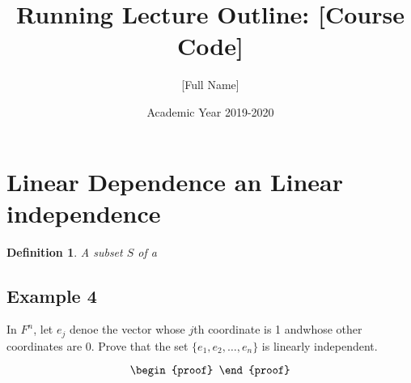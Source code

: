 \documentclass[10pt, oneside]{article}
\title{Running Lecture Outline: [Course Code]}
\author{[Full Name]}
\date{Academic Year 2019-2020}
\newtheorem{defn}{Definition}
\begin{document}
\maketitle
\tableofcontents

\vspace{.25in}

\section{Linear Dependence an Linear independence}

\begin{defn}
	A subset $S$ of a
\end{defn}

\subsection{Example 4}

In $F^n$, let $e_j$ denoe the vector whose $j$th coordinate is  1 andwhose other coordinates are 0.
Prove that the set $\{e_1, e_2, \ldots, e_n\}$ is linearly independent.

\[
	\begin{proof}
	\end{proof}
\]
\end{document}
